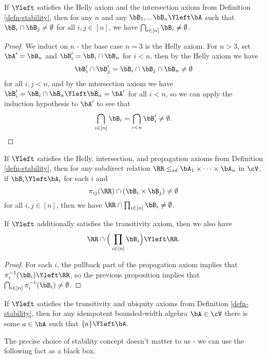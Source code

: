 \begin{prop} If $\Yleft$ satisfies the Helly axiom and the intersection axiom from Definition \ref{defn-stability}, then for any $n$ and any $\bB_1, ... \bB_n \Yleft \bA$ such that $\bB_i \cap \bB_j \ne \emptyset$ for all $i, j \in [n]$, we have $\bigcap_{i\in [n]} \bB_i \ne \emptyset$.
\end{prop}
\begin{proof} We induct on $n$ - the base case $n = 3$ is the Helly axiom. For $n > 3$, set $\bA' = \bB_n$ and $\bB_i' = \bB_i \cap \bB_n$ for $i < n$, then by the Helly axiom we have
\[
\bB_i' \cap \bB_j' = \bB_i \cap \bB_j \cap \bB_n \ne \emptyset
\]
for all $i,j < n$, and by the intersection axiom we have $\bB_i' = \bB_i \cap \bB_n \Yleft \bB_n = \bA'$ for all $i < n$, so we can apply the induction hypothesis to $\bA'$ to see that
\[
\bigcap_{i\in [n]} \bB_i = \bigcap_{i < n} \bB_i' \ne \emptyset.\qedhere
\]
\end{proof}

\begin{prop}\label{prop-stable-essential} If $\Yleft$ satisfies the Helly, intersection, and propagation axioms from Definition \ref{defn-stability}, then for any subdirect relation $\RR \le_{sd} \bA_1 \times \cdots \times \bA_n$ in $\cV$, if $\bB_i \Yleft \bA_i$ for each $i$ and
\[
\pi_{ij}(\RR) \cap (\bB_i \times \bB_j) \ne \emptyset
\]
for all $i,j \in [n]$, then we have $\RR \cap \prod_{i \in [n]} \bB_i \ne \emptyset$.

If $\Yleft$ additionally satisfies the transitivity axiom, then we also have
\[
\RR \cap \Big(\prod_{i \in [n]} \bB_i\Big) \Yleft \RR.
\]
\end{prop}
\begin{proof} For each $i$, the pullback part of the propagation axiom implies that $\pi_i^{-1}(\bB_i) \Yleft \RR$, so the previous proposition implies that $\bigcap_{i\in [n]} \pi_i^{-1}(\bB_i) \ne \emptyset$.
\end{proof}

\begin{prop}\label{prop-stable-element} If $\Yleft$ satisfies the transitivity and ubiquity axioms from Definition \ref{defn-stability}, then for any idempotent bounded-width algebra $\bA \in \cV$ there is some $a \in \bA$ such that $\{a\} \Yleft \bA$.
\end{prop}

The precise choice of stability concept doesn't matter to us - we can use the following fact as a black box.

